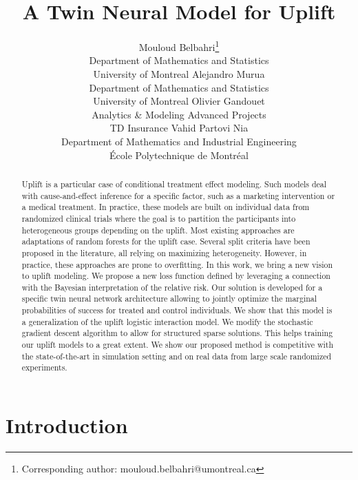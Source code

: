 \documentclass{article}
\title{A Twin Neural Model for Uplift}
\author{
   Mouloud Belbahri\thanks{Corresponding author: mouloud.belbahri@umontreal.ca} \\
  Department of Mathematics and Statistics\\
  University of Montreal
  \And
  Alejandro Murua\\
  Department of Mathematics and Statistics\\
  University of Montreal
  \And
  Olivier Gandouet\\
  Analytics \& Modeling Advanced Projects \\
  TD Insurance
  \And
  Vahid Partovi Nia \\
  Department of Mathematics and Industrial Engineering\\
  École Polytechnique de Montréal
}
\begin{document}
\maketitle

\begin{abstract}

Uplift is a particular case of conditional treatment effect modeling. Such models deal with cause-and-effect inference for a specific factor, such as a marketing intervention or a medical treatment. In practice, these models are built on individual data from randomized clinical trials where the goal is to partition the participants into heterogeneous groups depending on the uplift. Most existing approaches are adaptations of random forests for the uplift case. Several split criteria have been proposed in the literature, all relying on maximizing heterogeneity. However, in practice, these approaches are prone to overfitting. In this work, we bring a new vision to uplift modeling. We propose a new loss function defined by leveraging a connection with the Bayesian interpretation of the relative risk. Our solution is developed for a specific twin neural network architecture allowing to jointly optimize the marginal probabilities of success for treated and control individuals. We show that this model is a generalization of the uplift logistic interaction model. We modify the stochastic gradient descent algorithm to allow for structured sparse solutions. This helps training our uplift models to a great extent. We show our proposed method is competitive with the state-of-the-art in simulation setting and on real data from large scale randomized experiments.
\end{abstract}


\section{Introduction}
\label{sec:intro}
\end{document}
